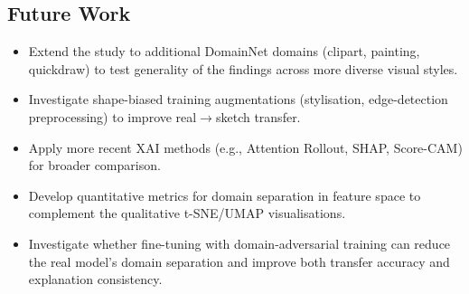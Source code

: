 \documentclass[12pt, a4paper]{article}
\begin{document}
\subsection{Future Work}

\begin{itemize}[leftmargin=*]
    \item Extend the study to additional DomainNet domains (clipart, painting,
          quickdraw) to test generality of the findings across more diverse
          visual styles.
    \item Investigate shape-biased training augmentations (stylisation,
          edge-detection preprocessing) to improve real$\to$sketch transfer.
    \item Apply more recent XAI methods (e.g., Attention Rollout, SHAP,
          Score-CAM) for broader comparison.
    \item Develop quantitative metrics for domain separation in feature space
          to complement the qualitative t-SNE/UMAP visualisations.
    \item Investigate whether fine-tuning with domain-adversarial training
          can reduce the real model's domain separation and improve both
          transfer accuracy and explanation consistency.
\end{itemize}
\end{document}
